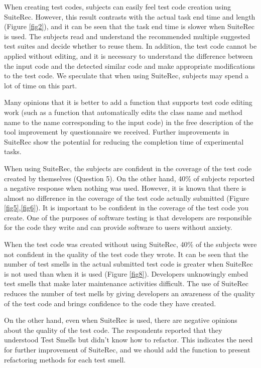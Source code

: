 \documentclass[conference]{IEEEtran}
\begin{document}
When creating test codes, subjects can easily feel test code creation using SuiteRec. However, this result contrasts with the actual task end time and length (Figure \ref{fig2}), and it can be seen that the task end time is slower when SuiteRec is used. The subjects read and understand the recommended multiple suggested test suites and decide whether to reuse them. In addition, the test code cannot be applied without editing, and it is necessary to understand the difference between the input code and the detected similar code and make appropriate modifications to the test code. We speculate that when using SuiteRec, subjects may spend a lot of time on this part. 

Many opinions that it is better to add a function that supports test code editing work (such as a function that automatically edits the class name and method name to the name corresponding to the input code) in the free description of the tool improvement by questionnaire we received. Further improvements in SuiteRec show the potential for reducing the completion time of experimental tasks.

When using SuiteRec, the subjects are confident in the coverage of the test code created by themselves (Question 5). On the other hand, 40\% of subjects reported a negative response when nothing was used. However, it is known that there is almost no difference in the coverage of the test code actually submitted (Figure \ref{fig5},\ref{fig6}). It is important to be confident in the coverage of the test code you create. One of the purposes of software testing is that developers are responsible for the code they write and can provide software to users without anxiety.

When the test code was created without using SuiteRec, 40\% of the subjects were not confident in the quality of the test code they wrote. It can be seen that the number of test smells in the actual submitted test code is greater when SuiteRec is not used than when it is used (Figure \ref{fig8}). Developers unknowingly embed test smells that make later maintenance activities difficult. The use of SuiteRec reduces the number of test mells by giving developers an awareness of the quality of the test code and brings confidence to the code they have created.

On the other hand, even when SuiteRec is used, there are negative opinions about the quality of the test code. The respondents reported that they understood Test Smells but didn't know how to refactor. This indicates the need for further improvement of SuiteRec, and we should add the function to present refactoring methods for each test smell.
\end{document}
